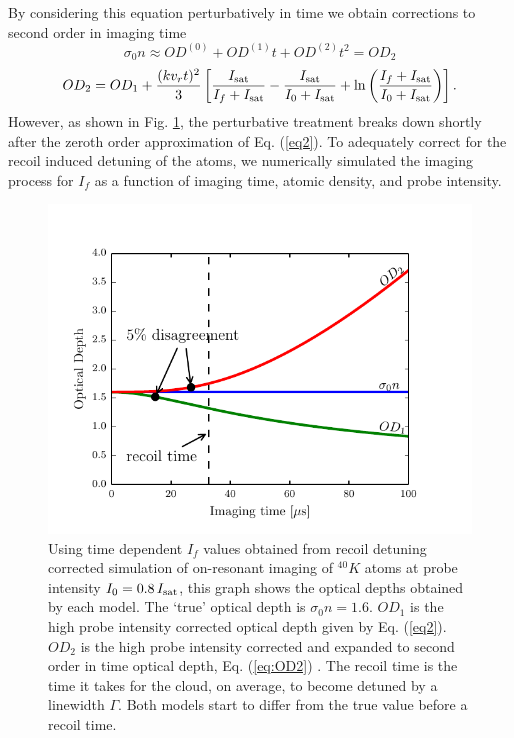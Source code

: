 \documentclass[12pt]{iopart}
\begin{document}
\par By considering this equation perturbatively in time we obtain corrections to second order in imaging time \cite{LJLthesis}
\begin{equation}
\sigma_0n\approx OD^{(0)}+OD^{(1)}t+OD^{(2)}t^2 = OD_2
\end{equation}
\begin{equation}
OD_2= OD_1+\frac{(kv_rt)^2}{3}\left[\frac{I_{\rm{sat}}}{I_f+I_{\rm{sat}}}-\frac{I_{\rm{sat}}}{I_0+I_{\rm{sat}}}+\mathrm{ln}\left(\frac{I_f+I_{\rm{sat}}}{I_0+I_{\rm{sat}}}\right)\right].
\label{eq:OD2}
\end{equation}
 However, as shown in  Fig. \ref{fig:ODcorrections}, the perturbative treatment breaks down shortly after the zeroth order approximation of Eq. (\ref{eq2}). To adequately correct for the recoil induced detuning of the atoms, we numerically simulated the imaging process for $I_f$ as a function of imaging time, atomic density, and probe intensity. 
\begin{figure}
	\includegraphics*{figure2.pdf}
\caption{Using time dependent $I_f$ values obtained from recoil detuning corrected simulation of on-resonant imaging of $^{40}K$ atoms at probe intensity $I_0=0.8\, I_{\rm{sat}}$, this graph shows the optical depths obtained by each model. The `true' optical depth is $\sigma_0 n=1.6$. $OD_1$ is the high probe intensity corrected optical depth given by Eq. (\ref{eq2}). $OD_2$ is the high probe intensity corrected and expanded to second order in time optical depth, Eq. (\ref{eq:OD2}) \cite{LJLthesis}. The recoil time is the time it takes for the cloud, on average, to become detuned by a linewidth $\Gamma$. Both models start to differ from the true value before a recoil time.  }  
\label{fig:ODcorrections}
\end{figure}
\end{document}
